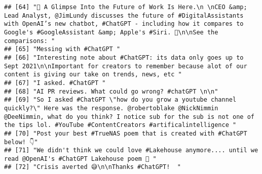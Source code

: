 \documentclass[
]{article}
\begin{document}
\begin{verbatim}
## [64] "👀 A Glimpse Into the Future of Work Is Here.\n \nCEO &amp; Lead Analyst, @JimLundy discusses the future of #DigitalAssistants with OpenAI’s new chatbot, #ChatGPT - including how it compares to Google's #GoogleAssistant &amp; Apple's #Siri. 🤖\n\nSee the comparisons: "                                  
## [65] "Messing with #ChatGPT "                                                                                                                                                                                                                                                                                        
## [66] "Interesting note about #ChatGPT: its data only goes up to Sept 2021\n\nImportant for creators to remember because alot of our content is giving our take on trends, news, etc "                                                                                                                                
## [67] "I asked. #ChatGPT "                                                                                                                                                                                                                                                                                            
## [68] "AI PR reviews. What could go wrong? #chatGPT \n\n"                                                                                                                                                                                                                                                             
## [69] "So I asked #ChatGPT \"how do you grow a youtube channel quickly?\" Here was the response. @robertoblake @NickNimmin @DeeNimmin, what do you think? I notice sub for the sub is not one of the tips lol. #YouTube #ContentCreators #artificalintelligence "                                                     
## [70] "Post your best #TrueNAS poem that is created with #ChatGPT below! 👇"                                                                                                                                                                                                                                          
## [71] "We didn't think we could love #Lakehouse anymore.... until we read @OpenAI's #ChatGPT Lakehouse poem 🥺 "                                                                                                                                                                                                      
## [72] "Crisis averted 😅\n\nThanks #ChatGPT!  "                                                                                                                                                                                                                                                                       

\end{verbatim}
\end{document}
